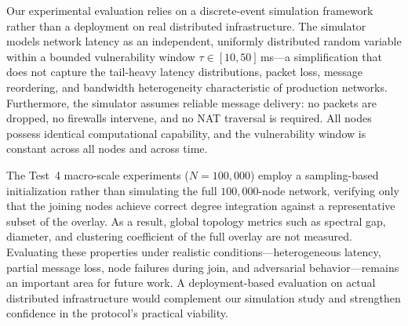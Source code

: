 \documentclass[runningheads]{llncs}
\begin{document}

Our experimental evaluation relies on a discrete-event simulation framework rather than a deployment on real distributed infrastructure. The simulator models network latency as an independent, uniformly distributed random variable within a bounded vulnerability window $\tau \in [10, 50]$\,ms---a simplification that does not capture the tail-heavy latency distributions, packet loss, message reordering, and bandwidth heterogeneity characteristic of production networks. Furthermore, the simulator assumes reliable message delivery: no packets are dropped, no firewalls intervene, and no NAT traversal is required. All nodes possess identical computational capability, and the vulnerability window is constant across all nodes and across time.

The Test~4 macro-scale experiments ($N = 100{,}000$) employ a sampling-based initialization rather than simulating the full $100{,}000$-node network, verifying only that the joining nodes achieve correct degree integration against a representative subset of the overlay. As a result, global topology metrics such as spectral gap, diameter, and clustering coefficient of the full overlay are not measured. Evaluating these properties under realistic conditions---heterogeneous latency, partial message loss, node failures during join, and adversarial behavior---remains an important area for future work. A deployment-based evaluation on actual distributed infrastructure would complement our simulation study and strengthen confidence in the protocol's practical viability.
\end{document}
